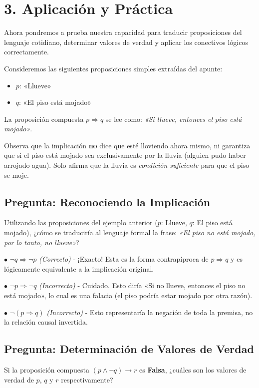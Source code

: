 \documentclass[11pt]{article}
\newenvironment{ejemplo}[1]{\begin{tcolorbox}[colback=gray!5,colframe=gray!60!black,title=Ejemplo: #1]}{\end{tcolorbox}}
\newenvironment{aplicacion}{\section*{3. Aplicación y Práctica}}{}
\newenvironment{preguntaalternativas}[1]{\subsection*{Pregunta: #1}\par\vspace{0.1cm}}{\vspace{0.3cm}}
\newcommand{\opcion}[3]{\par\noindent $\bullet$ \textbf{#1} \textit{(#2)} - #3\par\vspace{0.15cm}}
\begin{document}
\begin{aplicacion}
  Ahora pondremos a prueba nuestra capacidad para traducir proposiciones del lenguaje cotidiano, determinar valores de verdad y aplicar los conectivos lógicos correctamente.

  \begin{ejemplo}{Traducción al Lenguaje Formal}
    Consideremos las siguientes proposiciones simples extraídas del apunte:
    \begin{itemize}
      \item $p$: «Llueve»
      \item $q$: «El piso está mojado»
    \end{itemize}
    La proposición compuesta $p \Rightarrow q$ se lee como: \textit{«Si llueve, entonces el piso está mojado»}. 
    
    Observa que la implicación \textbf{no} dice que esté lloviendo ahora mismo, ni garantiza que si el piso está mojado sea exclusivamente por la lluvia (alguien pudo haber arrojado agua). Solo afirma que la lluvia es \textit{condición suficiente} para que el piso se moje.
  \end{ejemplo}

  \begin{preguntaalternativas}{Reconociendo la Implicación}
    Utilizando las proposiciones del ejemplo anterior ($p$: Llueve, $q$: El piso está mojado), ¿cómo se traduciría al lenguaje formal la frase: \textit{«El piso no está mojado, por lo tanto, no llueve»}?
    
    \opcion{$\neg q \Rightarrow \neg p$}{Correcto}{¡Exacto! Esta es la forma contrapíproca de $p \Rightarrow q$ y es lógicamente equivalente a la implicación original.}
    \opcion{$\neg p \Rightarrow \neg q$}{Incorrecto}{Cuidado. Esto diría «Si no llueve, entonces el piso no está mojado», lo cual es una falacia (el piso podría estar mojado por otra razón).}
    \opcion{$\neg (p \Rightarrow q)$}{Incorrecto}{Esto representaría la negación de toda la premisa, no la relación causal invertida.}
  \end{preguntaalternativas}

  \begin{preguntaalternativas}{Determinación de Valores de Verdad}
    Si la proposición compuesta $(p \wedge \neg q) \rightarrow r$ es \textbf{Falsa}, ¿cuáles son los valores de verdad de $p$, $q$ y $r$ respectivamente?
    

\end{preguntaalternativas}
\end{aplicacion}
\end{document}
